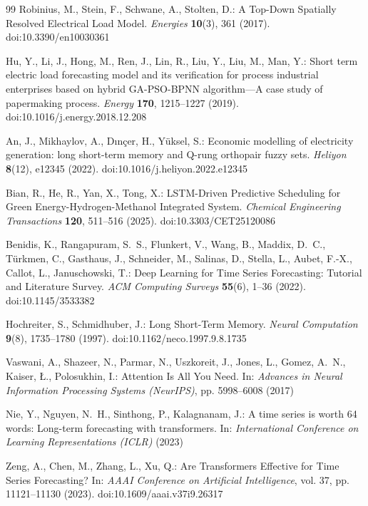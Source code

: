 \documentclass[pdflatex,sn-mathphys-num]{sn-jnl}
\theoremstyle{thmstyleone}
\theoremstyle{thmstyletwo}
\theoremstyle{thmstylethree}
\begin{document}
\begin{thebibliography}{99}
Robinius, M., Stein, F., Schwane, A., Stolten, D.: A Top-Down Spatially Resolved Electrical Load Model. \textit{Energies} \textbf{10}(3), 361 (2017). doi:10.3390/en10030361

Hu, Y., Li, J., Hong, M., Ren, J., Lin, R., Liu, Y., Liu, M., Man, Y.: Short term electric load forecasting model and its verification for process industrial enterprises based on hybrid GA-PSO-BPNN algorithm---A case study of papermaking process. \textit{Energy} \textbf{170}, 1215--1227 (2019). doi:10.1016/j.energy.2018.12.208

An, J., Mikhaylov, A., D{\i}n{\c{c}}er, H., Y\"uksel, S.: Economic modelling of electricity generation: long short-term memory and Q-rung orthopair fuzzy sets. \textit{Heliyon} \textbf{8}(12), e12345 (2022). doi:10.1016/j.heliyon.2022.e12345

Bian, R., He, R., Yan, X., Tong, X.: LSTM-Driven Predictive Scheduling for Green Energy-Hydrogen-Methanol Integrated System. \textit{Chemical Engineering Transactions} \textbf{120}, 511--516 (2025). doi:10.3303/CET25120086

Benidis, K., Rangapuram, S.~S., Flunkert, V., Wang, B., Maddix, D.~C., T\"urkmen, C., Gasthaus, J., Schneider, M., Salinas, D., Stella, L., Aubet, F.-X., Callot, L., Januschowski, T.: Deep Learning for Time Series Forecasting: Tutorial and Literature Survey. \textit{ACM Computing Surveys} \textbf{55}(6), 1--36 (2022). doi:10.1145/3533382

Hochreiter, S., Schmidhuber, J.: Long Short-Term Memory. \textit{Neural Computation} \textbf{9}(8), 1735--1780 (1997). doi:10.1162/neco.1997.9.8.1735

Vaswani, A., Shazeer, N., Parmar, N., Uszkoreit, J., Jones, L., Gomez, A.~N., Kaiser, {\L}., Polosukhin, I.: Attention Is All You Need. In: \textit{Advances in Neural Information Processing Systems (NeurIPS)}, pp. 5998--6008 (2017)

Nie, Y., Nguyen, N.~H., Sinthong, P., Kalagnanam, J.: A time series is worth 64 words: Long-term forecasting with transformers. In: \textit{International Conference on Learning Representations (ICLR)} (2023)

Zeng, A., Chen, M., Zhang, L., Xu, Q.: Are Transformers Effective for Time Series Forecasting? In: \textit{AAAI Conference on Artificial Intelligence}, vol. 37, pp. 11121--11130 (2023). doi:10.1609/aaai.v37i9.26317


\end{thebibliography}
\end{document}
